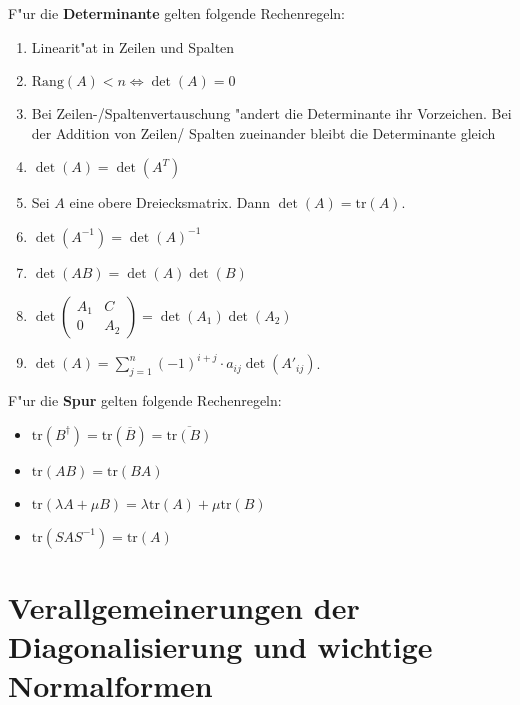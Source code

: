 \documentclass[9pt, a4paper, twocolumn, landscape]{article}
\begin{document}
\begin{theorem}
F"ur die \textbf{Determinante} gelten folgende Rechenregeln:
\begin{enumerate}
\item Linearit"at in Zeilen und Spalten
\item $\mathrm{Rang}(A) < n \Leftrightarrow \det (A) = 0 $
\item Bei Zeilen-/Spaltenvertauschung "andert die Determinante ihr Vorzeichen. Bei der Addition von Zeilen/ Spalten zueinander bleibt die Determinante gleich
\item $\det (A) = \det (A^T)$
\item Sei $A$ eine obere Dreiecksmatrix. Dann $\det(A) = \mathrm{tr}(A)$.
\item $\det (A^{-1}) = \det (A)^{-1}$
\item $\det(AB) = \det (A) \det(B)$
\item $\det \left( \begin{array}{cc} A_1 & C \\ 0 & A_2 \end{array} \right) = \det (A_1) \det (A_2)$
\item $\det (A) = \sum_{j = 1}^n (-1)^{i + j} \cdot a_{ij} \det (A'_{ij})$.
\end{enumerate}
\end{theorem}



\begin{lemma}
F"ur die \textbf{Spur} gelten folgende Rechenregeln:
\begin{itemize}
\item $\mathrm{tr}(B^\dagger) = \mathrm{tr}(\overline{B}) = \overline{\mathrm{tr}({B})}$
\item $\mathrm{tr}(AB) = \mathrm{tr}(BA)$
\item $\mathrm{tr}(\lambda A + \mu B) = \lambda \mathrm{tr}(A )+ \mu \mathrm{tr}(B)$
\item $\mathrm{tr}(S A S^{-1}) = \mathrm{tr}(A)$
\end{itemize}

\end{lemma}





\section{Verallgemeinerungen der Diagonalisierung und wichtige Normalformen}
\end{document}

